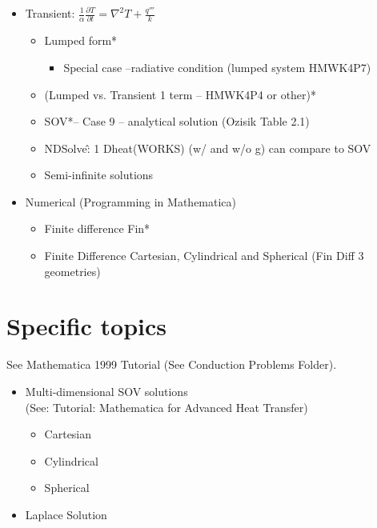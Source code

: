 \begin{appendices}
\begin{itemize}
\item Transient: $\frac{1}{\alpha}\frac{\partial T}{\partial t}
=\nabla^2T+\frac{q'''}{k}$
\begin{itemize}
\item Lumped form*
\begin{itemize}
\item Special case –radiative condition (lumped system HMWK4P7)
\end{itemize}
\item (Lumped vs. Transient 1 term – HMWK4P4 or other)*
\item SOV*–  Case 9 – analytical solution (Ozisik Table 2.1)
\item NDSolve\^: 1 Dheat(WORKS) (w/ and w/o g) can compare to SOV
\item Semi-infinite solutions
\end{itemize}


\item Numerical (Programming in Mathematica)
\begin{itemize}
\item Finite difference Fin*
\item Finite Difference Cartesian, Cylindrical and Spherical (Fin Diff 3 geometries)
\end{itemize}

\end{itemize}

\section*{Specific topics \uppercase\expandafter{}}
See Mathematica 1999 Tutorial (See Conduction Problems Folder).
\begin{itemize}
\item Multi-dimensional SOV solutions \\
(See:  Tutorial: Mathematica for Advanced Heat Transfer)
\begin{itemize}
\item Cartesian
\item Cylindrical
\item Spherical
\end{itemize}

\item Laplace Solution

\end{itemize}


\end{appendices}
